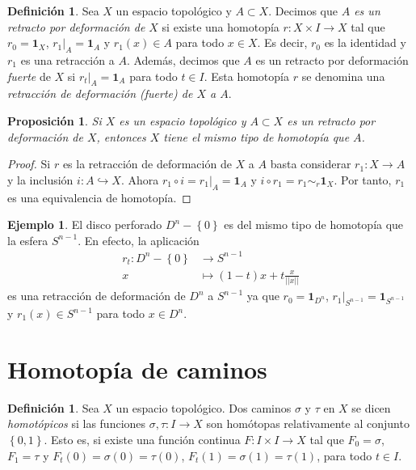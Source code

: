 \documentclass[12pt,a4paper]{book}
\newtheorem{prop}[thm]{Proposición}
\theoremstyle{definition} \newtheorem{defn}[thm]{Definición}
\theoremstyle{definition} \newtheorem{ejemplo}[thm]{Ejemplo}
\theoremstyle{definition} \newtheorem{ejercicio}[thm]{Ejercicio}
\theoremstyle{remark} \newtheorem*{obs}{Observación}
\def\id{\mathbf{1}}
\begin{document}
\begin{defn}
  Sea $X$ un espacio topológico y $A\subset X$. Decimos que \emph{$A$ es un retracto por deformación de $X$} si existe una homotopía $r:X\times I \rightarrow X$ tal que $r_0=\id_X$, $r_1|_A=\id_A$ y $r_1(x)\in A$ para todo $x\in X$. Es decir, $r_0$ es la identidad y $r_1$ es una retracción a $A$. Además, decimos que $A$ es un retracto por deformación \emph{fuerte} de $X$ si $r_t|_A=\id_A$ para todo $t\in I$. Esta homotopía $r$ se denomina una \emph{retracción de deformación (fuerte) de $X$ a $A$}.
\end{defn}

\begin{prop}
  Si $X$ es un espacio topológico y $A\subset X$ es un retracto por deformación de $X$, entonces $X$ tiene el mismo tipo de homotopía que $A$.
\end{prop}
\begin{proof}
  Si $r$ es la retracción de deformación de $X$ a $A$ basta considerar $r_1:X\rightarrow A$ y la inclusión $i:A\hookrightarrow X$. Ahora $r_1\circ i=r_1|_{A}=\id_A$ y $i\circ r_1 = r_1 \sim_r \id_X$. Por tanto, $r_1$ es una equivalencia de homotopía.
\end{proof}

\begin{ejemplo}\label{perforado}
  El disco perforado $D^n-\left\{ 0 \right\}$ es del mismo tipo de homotopía que la esfera $S^{n-1}$. En efecto, la aplicación
  \begin{align*}
    r_t :D^n-\left\{ 0 \right\}&\longrightarrow S^{n-1}\\ 
    x &\longmapsto (1-t)x + t\frac{x}{||x||} 
    \end{align*}
    es una retracción de deformación de $D^n$ a $S^{n-1}$ ya que $r_0=\id_{D^n}$, $r_1|_{S^{n-1}}=\id_{S^{n-1}}$ y $r_1(x)\in S^{n-1}$ para todo $x \in D^n$.
\end{ejemplo}

\section{Homotopía de caminos}
\begin{defn}
  Sea $X$ un espacio topológico. Dos caminos $\sigma$ y $\tau$ en $X$ se dicen \emph{homotópicos} si las funciones $\sigma, \tau: I \rightarrow X$ son homótopas relativamente al conjunto $\left\{ 0,1 \right\}$. Esto es, si existe una función continua $F:I\times I \rightarrow X$ tal que $F_0=\sigma$, $F_1=\tau$ y $F_t(0)=\sigma(0)=\tau(0)$, $F_t(1)=\sigma(1)=\tau(1)$, para todo $t \in I$.
\end{defn}
\end{document}
